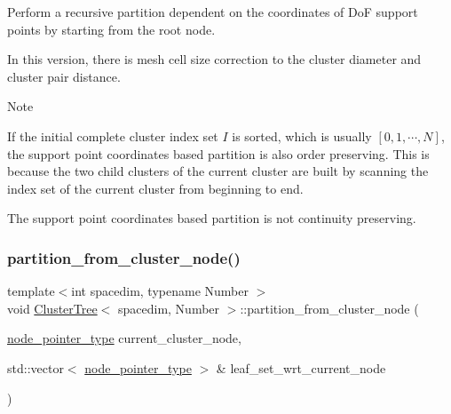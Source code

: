 Perform a recursive partition dependent on the coordinates of DoF support points by starting from the root node.

In this version, there is mesh cell size correction to the cluster diameter and cluster pair distance.


\begin{DoxyDescription}
\item[Note ]
\begin{DoxyEnumerate}
\item If the initial complete cluster index set $I$ is sorted, which is usually $[0, 1, \cdots, N]$, the support point coordinates based partition is also order preserving. This is because the two child clusters of the current cluster are built by scanning the index set of the current cluster from beginning to end.
\item The support point coordinates based partition is not continuity preserving.  
\end{DoxyEnumerate}
\end{DoxyDescription}\mbox{\label{classClusterTree_a8b650f0c7cc83adbde5aad9556a57ac3}} 
\subsubsection{\texorpdfstring{partition\+\_\+from\+\_\+cluster\+\_\+node()}{partition\_from\_cluster\_node()}\hspace{0.1cm}{\footnotesize\ttfamily [1/3]}}
{\footnotesize\ttfamily template$<$int spacedim, typename Number $>$ \\
void \hyperlink{classClusterTree}{Cluster\+Tree}$<$ spacedim, Number $>$\+::partition\+\_\+from\+\_\+cluster\+\_\+node (\begin{DoxyParamCaption}\item[{\hyperlink{classClusterTree_ae4bb0fdc7ac559d7844d04a00ab3e9de}{node\+\_\+pointer\+\_\+type}}]{current\+\_\+cluster\+\_\+node,  }\item[{std\+::vector$<$ \hyperlink{classClusterTree_ae4bb0fdc7ac559d7844d04a00ab3e9de}{node\+\_\+pointer\+\_\+type} $>$ \&}]{leaf\+\_\+set\+\_\+wrt\+\_\+current\+\_\+node }\end{DoxyParamCaption})\hspace{0.3cm}{\ttfamily [private]}}

